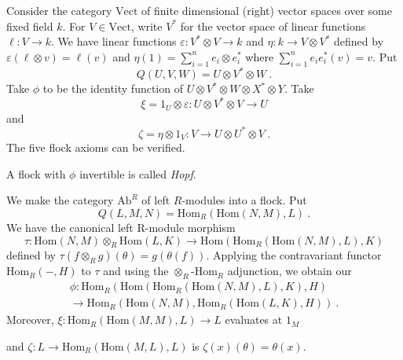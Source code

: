 \documentclass{beamer}
\newcommand{\lra}{\longrightarrow}
\begin{document}
\begin{frame}
\begin{example}
Consider the category $\mathrm{Vect}$ of finite dimensional (right) vector spaces over some fixed field $k$.
For $V\in \mathrm{Vect}$, write $V^*$ for the vector space of linear functions $\ell : V\lra k$. 
We have linear functions $\varepsilon : V^*\otimes V \lra k$ and $\eta : k \lra V\otimes V^*$
defined by $\varepsilon (\ell \otimes v) =\ell (v)$ and $\eta (1) = \sum_{i=1}^n e_i\otimes e^*_i$
where $\sum_{i=1}^n e_ie^*_i(v)=v$.  
Put $$Q(U,V,W)=U\otimes V^*\otimes W \ .$$ 
Take $\phi$ to be the identity function of
$U\otimes V^*\otimes W\otimes X^*\otimes Y$. 
Take $$\xi = 1_U\otimes \varepsilon : U\otimes V^*\otimes V \lra U$$ and
$$\zeta = \eta \otimes 1_V : V \lra U\otimes U^*\otimes V \ .$$
The five flock axioms can be verified.
\end{example}

\pause
A flock with $\phi$ invertible is called {\em Hopf}.
\end{frame}
\begin{frame}
\begin{example}
We make the category $\mathrm{Ab}^R$ of left $R$-modules into a flock.
Put $$Q(L,M,N)=\mathrm{Hom}_R(\mathrm{Hom}(N,M),L) \ .$$
\pause
We have the canonical left R-module morphism
$$\tau : \mathrm{Hom}(N,M) \otimes_R \mathrm{Hom}(L,K) \lra \mathrm{Hom}(\mathrm{Hom}_R(\mathrm{Hom}(N,M),L),K)$$
defined by $\tau (f\otimes_Rg)(\theta)=g(\theta(f))$.
Applying the contravariant functor $\mathrm{Hom}_R(-,H)$ to $\tau$ 
and using the $\otimes_R$-$\mathrm{Hom}_R$ adjunction, we obtain our  
\begin{eqnarray*}
\phi : \mathrm{Hom}_R(\mathrm{Hom}(\mathrm{Hom}_R(\mathrm{Hom}(N,M),L),K),H) \\
\lra \mathrm{Hom}_R(\mathrm{Hom}(N,M),\mathrm{Hom}_R(\mathrm{Hom}(L,K),H)) \ .
\end{eqnarray*}
\pause
Moreover, $\xi :\mathrm{Hom}_R(\mathrm{Hom}(M,M),L)\lra L$ evaluates at $1_M$ 

and
$\zeta : L\lra \mathrm{Hom}_R(\mathrm{Hom}(M,L),L)$ is $\zeta (x)(\theta)=\theta (x)$.
\end{example}
\end{frame}
\end{document}
